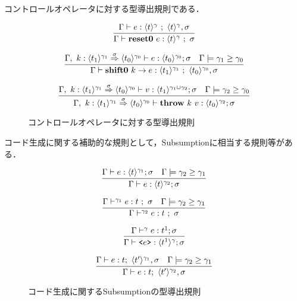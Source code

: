 コントロールオペレータに対する型導出規則である．

\begin{figure}[H]
  \centering
  \[
    \infer{\Gamma \vdash \resetz{e} : \codeT{t}{\gamma} ~;~ \sigma}
    {\Gamma \vdash e : \codeT{t}{\gamma} ~;~ \codeT{t}{\gamma}, \sigma}
  \]

  \[
    \infer{\Gamma \vdash \shiftz{k}{e} : \codeT{t_1}{\gamma_1} ~;~ \codeT{t_0}{\gamma_0},\sigma}
    {\Gamma,~k:\contT{\codeT{t_1}{\gamma_1}}{\codeT{t_0}{\gamma_0}}{\sigma}
      \vdash e : \codeT{t_0}{\gamma_0} ; \sigma
      & \Gamma \models \gamma_1 \ord \gamma_0
    }
  \]

  \[
    \infer
    {\Gamma,~ k:\contT{\codeT{t_1}{\gamma_1}}{\codeT{t_0}{\gamma_0}}{\sigma}
      \vdash \throw{k}{v} : \codeT{t_0}{\gamma_2} ; \sigma}
    {\Gamma,~ k:\contT{\codeT{t_1}{\gamma_1}}{\codeT{t_0}{\gamma_0}}{\sigma}
      \vdash v : \codeT{t_1}{\gamma_1 \cup \gamma_2} ; \sigma
      & \Gamma \models \gamma_2 \ord \gamma_0
    }
  \]
  \caption{コントロールオペレータに対する型導出規則}
  \label{fig:controlop_type_rule}
\end{figure}
\hrulefill

コード生成に関する補助的な規則として，Subsumptionに相当する規則等がある．


\begin{figure}[H]
  \centering
  \[
    \infer
    {\Gamma \vdash e : \codeT{t}{\gamma_2} ; \sigma}
    {\Gamma \vdash e : \codeT{t}{\gamma_1} ; \sigma
      & \Gamma \models \gamma_2 \ord \gamma_1
    }
  \]

  \[
    \infer
    {\Gamma \vdash^{\gamma_2} e : t ~;~ \sigma}
    {\Gamma \vdash^{\gamma_1} e : t ~;~ \sigma
      & \Gamma \models \gamma_2 \ord \gamma_1
    }
  \]


  \[
    \infer
    {\Gamma \vdash \code{e} : \codeT{t^1}{\gamma} ; \sigma}
    {\Gamma \vdash^{\gamma} e : t^1 ; \sigma}
  \]

  \[
    \infer
    {\Gamma \vdash e : t;~\codeT{t'}{\gamma_2},\sigma}
    {\Gamma \vdash e : t;~\codeT{t'}{\gamma_1},\sigma
      & \Gamma \models \gamma_2 \ord \gamma_1
    }
  \]

  \caption{コード生成に関するSubsumptionの型導出規則}
  \label{fig:code_gen_subs_type_rule}
\end{figure}
\hrulefill

